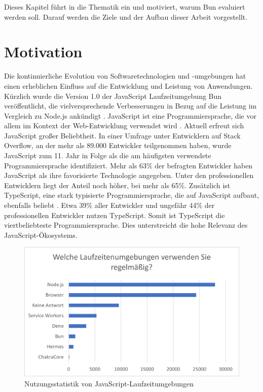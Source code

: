 \pagestyle{fancy-style}
 \label{ch:introduction}
Dieses Kapitel führt in die Thematik ein und motiviert, warum Bun evaluiert werden soll. Darauf werden die Ziele und der Aufbau dieser Arbeit vorgestellt.

\section{Motivation} \label{sec:introduction-motivation}
Die kontinuierliche Evolution von Softwaretechnologien und -umgebungen hat einen erheblichen Einfluss auf die Entwicklung und Leistung von Anwendungen. Kürzlich wurde die Version 1.0 der JavaScript Laufzeitumgebung Bun veröffentlicht, die vielversprechende Verbesserungen in Bezug auf die Leistung im Vergleich zu Node.js ankündigt \cite{Sumner.2023b}. \newline
JavaScript ist eine Programmiersprache, die vor allem im Kontext der Web-Entwicklung verwendet wird \cite{Brown.November2019}. Aktuell erfreut sich JavaScript großer Beliebtheit. In einer Umfrage unter Entwicklern auf Stack Overflow, an der mehr als 89.000 Entwickler teilgenommen haben, wurde JavaScript zum 11. Jahr in Folge als die am häufigsten verwendete Programmiersprache identifiziert. Mehr als 63\% der befragten Entwickler haben JavaScript als ihre favorisierte Technologie angegeben. Unter den professionellen Entwicklern liegt der Anteil noch höher, bei mehr als 65\%. Zusätzlich ist TypeScript, eine stark typisierte Programmiersprache, die auf 
JavaScript aufbaut, ebenfalls beliebt \cite{Microsoft.o.J.}. Etwa 39\% aller Entwickler und ungefähr 44\% der professionellen Entwickler nutzen TypeScript. Somit ist TypeScript die viertbeliebteste Programmiersprache. Dies unterstreicht die hohe Relevanz des JavaScript-Ökosystems.\cite{StackOverflow.2023}\\

\begin{figure}[h]
	\centering
	\includegraphics[width=\linewidth]{./images/WhichRuntimesDoYouUseRegularly}
	\caption[Nutzungsstatistik von JavaScript-Laufzeitumgebungen]{Nutzungsstatistik von JavaScript-Laufzeitumgebungen \cite{Greif.2022}}
	\label{fig:runtime-share}
\end{figure}

